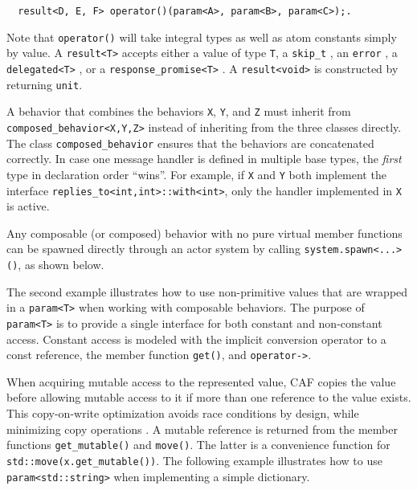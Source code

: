 \begin{lstlisting}
  result<D, E, F> operator()(param<A>, param<B>, param<C>);.
\end{lstlisting}

Note that \lstinline^operator()^ will take integral types as well as atom
constants simply by value. A \lstinline^result<T>^ accepts either a value of
type \lstinline^T^, a \lstinline^skip_t^ , an
\lstinline^error^ , a \lstinline^delegated<T>^ , or a
\lstinline^response_promise<T>^ . A \lstinline^result<void>^ is
constructed by returning \lstinline^unit^.

A behavior that combines the behaviors \lstinline^X^, \lstinline^Y^, and
\lstinline^Z^ must inherit from \lstinline^composed_behavior<X,Y,Z>^ instead of
inheriting from the three classes directly. The class
\lstinline^composed_behavior^ ensures that the behaviors are concatenated
correctly. In case one message handler is defined in multiple base types, the
\emph{first} type in declaration order ``wins''. For example, if \lstinline^X^
and \lstinline^Y^ both implement the interface
\lstinline^replies_to<int,int>::with<int>^, only the handler implemented in
\lstinline^X^ is active.

Any composable (or composed) behavior with no pure virtual member functions can
be spawned directly through an actor system by calling
\lstinline^system.spawn<...>()^, as shown below.


\clearpage

The second example illustrates how to use non-primitive values that are wrapped
in a \lstinline^param<T>^ when working with composable behaviors. The purpose
of \lstinline^param<T>^ is to provide a single interface for both constant and
non-constant access. Constant access is modeled with the implicit conversion
operator to a const reference, the member function \lstinline^get()^, and
\lstinline^operator->^.

When acquiring mutable access to the represented value, CAF copies the value
before allowing mutable access to it if more than one reference to the value
exists. This copy-on-write optimization avoids race conditions by design, while
minimizing copy operations . A mutable reference is returned
from the member functions \lstinline^get_mutable()^ and \lstinline^move()^. The
latter is a convenience function for \lstinline^std::move(x.get_mutable())^.
The following example illustrates how to use \lstinline^param<std::string>^
when implementing a simple dictionary.

